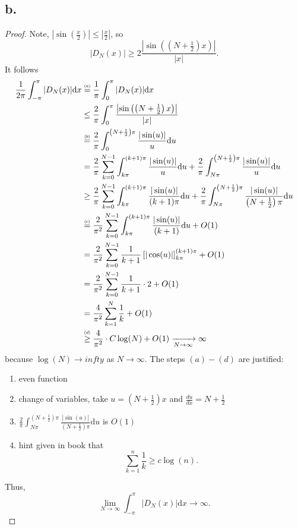 \documentclass{article}
\newcommand\numeq[1]%
  {\stackrel{\scriptscriptstyle(\mkern-1.5mu#1\mkern-1.5mu)}{=}}
\newcommand\numgeq[1]
  {\stackrel{\scriptscriptstyle(\mkern-1.5mu#1\mkern-1.5mu)}{\geq}}
\begin{document}
\subsection*{b.}
\begin{proof}
  Note, $\left|\sin\left(\frac{x}{2}\right)\right| \leq \left|\frac{x}{2}\right|$, so 
  \[
  |D_N(x)| \geq 2 \frac{\left|\sin\left(\left(N + \frac{1}{2}\right)x\right)\right|}{|x|}.  
  \]
  It follows 
  \begin{align*}
    \frac{1}{2 \pi} \int_{-\pi}^{\pi}|D_N(x)|\mathrm{d}x &\numeq{a}\frac{1}{\pi}\int_0^{\pi}|D_N(x)|\mathrm{d}x \\
    &\leq \frac{2}{\pi}\int_0^{\pi}\frac{\left|\sin\left(\left(N + \frac{1}{2}\right)x\right)\right|}{|x|}\\
    &\numeq{b}\frac{2}{\pi}\int_0^{\left(N + \frac{1}{2}\right)\pi}\frac{|\sin(u)|}{u}\mathrm{d}u \\
    &= \frac{2}{\pi}\sum\limits_{k = 0}^{N - 1}\int_{k \pi}^{(k + 1)\pi} \frac{|\sin(u)|}{u}\mathrm{d}u + \frac{2}{\pi}\int_{N \pi}^{\left(N + \frac{1}{2}\right)\pi}\frac{|\sin(u)|}{u}\mathrm{d}u \\
    &\geq \frac{2}{\pi}\sum\limits_{k = 0}^{N - 1}\int_{k \pi}^{(k + 1)\pi} \frac{|\sin(u)|}{(k + 1)\pi}\mathrm{d}u + \frac{2}{\pi}\int_{N \pi}^{\left(N + \frac{1}{2}\right)\pi}\frac{|\sin(u)|}{\left(N + \frac{1}{2}\right)\pi}\mathrm{d}u \\
    &\numeq{c} \frac{2}{\pi^2} \sum\limits_{k = 0}^{N - 1}\int_{k \pi}^{(k + 1)\pi} \frac{|\sin(u)|}{(k + 1)}\mathrm{d}u + O(1) \\
    &= \frac{2}{\pi^2}\sum\limits_{k = 0}^{N - 1}\frac{1}{k + 1}\left[|\cos(u)|\right]_{k \pi}^{(k + 1)\pi} + O(1) \\
    &= \frac{2}{\pi^2}\sum\limits_{k = 0}^{N - 1}\frac{1}{k + 1}\cdot 2 + O(1)\\
    &= \frac{4}{\pi^2}\sum\limits_{k = 1}^N\frac{1}{k}+ O(1) \\
    &\numgeq{d}\frac{4}{\pi^2}\cdot C \log(N) + O(1) \xrightarrow[N \to \infty]{}\infty
  \end{align*}
  because $\log(N) \to infty$ as $N\to \infty$.
  The steps $(a)-(d)$ are justified:
  \begin{enumerate}[\indent(a)]
    \item even function
    \item change of variables, take $u= \left(N + \frac{1}{2}\right)x$ and $\frac{du}{dx} = N + \frac{1}{2}$
    \item $\frac{2}{\pi}\int_{N \pi}^{\left(N + \frac{1}{2}\right)\pi}\frac{|\sin(u)|}{\left(N + \frac{1}{2}\right)\pi}\mathrm{d}u$ is $O(1)$
    \item hint given in book that
    \[
    \sum\limits_{k = 1}^n\frac{1}{k} \geq c \log(n).  
    \]
  \end{enumerate} 
  Thus, 
  \[
  \lim\limits_{N \to \infty} \int_{-\pi}^{\pi}|D_N(x)|\mathrm{d}x \to \infty.
  \]
\end{proof}
\end{document}
